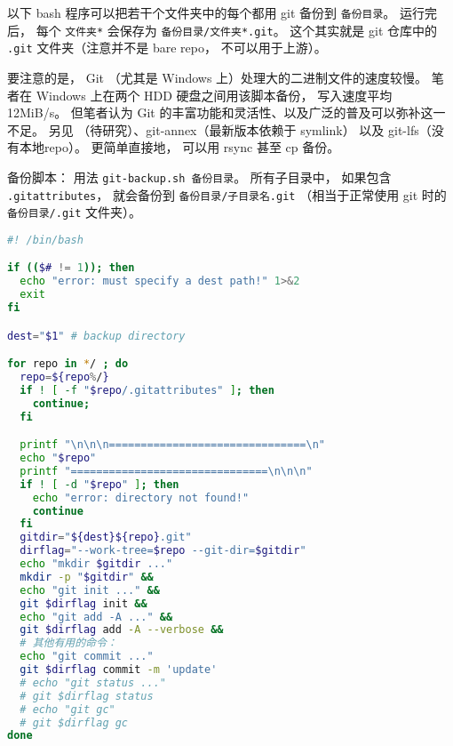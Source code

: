 
\begin{issues}
\issueDraft
\end{issues}


以下 bash 程序可以把若干个文件夹中的每个都用 git 备份到 \verb|备份目录|。 运行完后， 每个 \verb|文件夹*| 会保存为 \verb|备份目录/文件夹*.git|。 这个其实就是 git 仓库中的 \verb|.git| 文件夹（注意并不是 bare repo， 不可以用于上游）。

要注意的是， Git （尤其是 Windows 上）处理大的二进制文件的速度较慢。 笔者在 Windows 上在两个 HDD 硬盘之间用该脚本备份， 写入速度平均 12MiB/s。 但笔者认为 Git 的丰富功能和灵活性、以及广泛的普及可以弥补这一不足。 另见 （待研究）、git-annex（最新版本依赖于 symlink） 以及 git-lfs（没有本地repo）。 更简单直接地， 可以用 rsync 甚至 cp 备份。

备份脚本： 用法 \verb|git-backup.sh 备份目录|。 所有子目录中， 如果包含 \verb|.gitattributes|， 就会备份到 \verb|备份目录/子目录名.git| （相当于正常使用 git 时的 \verb|备份目录/.git| 文件夹）。
\begin{lstlisting}[language=bash, caption=git-backup.sh]
#! /bin/bash

if (($# != 1)); then
  echo "error: must specify a dest path!" 1>&2
  exit
fi

dest="$1" # backup directory

for repo in */ ; do
  repo=${repo%/}
  if ! [ -f "$repo/.gitattributes" ]; then
    continue;
  fi

  printf "\n\n\n===============================\n"
  echo "$repo"
  printf "===============================\n\n\n"
  if ! [ -d "$repo" ]; then
    echo "error: directory not found!"
    continue
  fi
  gitdir="${dest}${repo}.git"
  dirflag="--work-tree=$repo --git-dir=$gitdir"
  echo "mkdir $gitdir ..."
  mkdir -p "$gitdir" &&
  echo "git init ..." &&
  git $dirflag init &&
  echo "git add -A ..." &&
  git $dirflag add -A --verbose &&
  # 其他有用的命令：
  echo "git commit ..."
  git $dirflag commit -m 'update'
  # echo "git status ..."
  # git $dirflag status
  # echo "git gc"
  # git $dirflag gc
done
\end{lstlisting}

